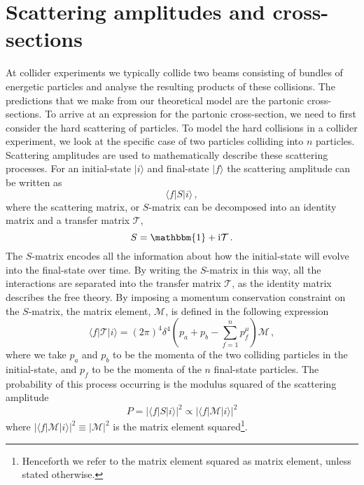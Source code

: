 \documentclass[main.tex]{subfiles}
\begin{document}
\section{Scattering amplitudes and cross-sections}\label{sec:xs}
    At collider experiments we typically collide
    two beams consisting of bundles of energetic
    particles and analyse the resulting products
    of these collisions. The predictions that we make
    from our theoretical model are the partonic
    cross-sections. To arrive at an expression
    for the partonic cross-section, we need to
    first consider the hard scattering of particles.
    To model the hard collisions in
    a collider experiment, we look at the specific
    case of two particles colliding into $n$ particles.
    Scattering amplitudes are used to mathematically
    describe these scattering processes.
    For an initial-state
    $|i\rangle$ and final-state $|f\rangle$
    the scattering amplitude can be written as
    \begin{equation}\label{eqn:scattering}
        \langle f | S | i \rangle \, ,
    \end{equation}
    where the scattering matrix, or $S$-matrix
    can be decomposed into an identity matrix
    and a transfer matrix $\mathcal{T}$,
    \begin{equation}\label{eqn:S_matrix}
        S = \mathbbm{1} + \mathrm{i}\mathcal{T} \, .
    \end{equation}
    The $S$-matrix encodes all the information
    about how the initial-state will evolve
    into the final-state over time. By writing
    the $S$-matrix in this way, all the interactions
    are separated into the transfer matrix $\mathcal{T}$,
    as the identity matrix describes the free theory.
    By imposing a momentum conservation constraint
    on the $S$-matrix, the matrix element,
    $\mathcal{M}$, is defined in the following expression
    \begin{equation}\label{eqn:S_matrix_element}
        \langle f | \mathcal{T} | i \rangle = (2\pi)^{4} \delta^{4}\left(p_{a} + p_{b} - \sum_{f=1}^{n} p_{f}^{\mu}\right) \mathcal{M} \, ,
    \end{equation}
    where we take $p_{a}$ and $p_{b}$ to be
    the momenta of the two colliding
    particles in the initial-state, and $p_{f}$ to be the
    momenta of the $n$ final-state particles.
    The probability of this process occurring
    is the modulus squared of the scattering amplitude
    \begin{equation}\label{eqn:S_prob}
        P = |\langle f | S | i \rangle|^{2} \propto | \langle f | \mathcal{M} | i \rangle |^{2}
    \end{equation}
    where $|\langle f | \mathcal{M} | i \rangle|^{2}  \equiv |\mathcal{M}|^{2}$
    is the matrix element squared\footnote{Henceforth we refer to the matrix
    element squared as matrix element, unless stated otherwise.}.
    
\end{document}
